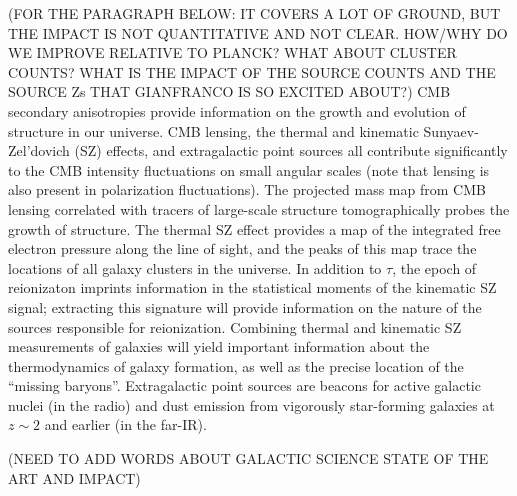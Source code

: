 \documentclass[PICOReport.tex]{subfiles}
\begin{document}
(FOR THE PARAGRAPH BELOW: IT COVERS A LOT OF GROUND, BUT THE IMPACT IS NOT QUANTITATIVE
AND NOT CLEAR. HOW/WHY DO WE IMPROVE RELATIVE TO PLANCK? WHAT ABOUT 
CLUSTER COUNTS? WHAT IS THE IMPACT OF THE SOURCE COUNTS AND THE SOURCE Zs THAT 
GIANFRANCO IS SO EXCITED ABOUT?)
CMB secondary anisotropies provide information on the growth and evolution of structure in our universe. 
CMB lensing, the thermal and kinematic Sunyaev-Zel'dovich (SZ) effects, and extragalactic point sources all 
contribute significantly to the CMB intensity fluctuations on small angular scales (note that lensing is also 
present in polarization fluctuations). The projected mass map from CMB lensing correlated with tracers of 
large-scale structure tomographically probes the growth of structure. The thermal SZ effect provides a map of 
the integrated free electron pressure along the line of sight, and the peaks of this map trace the locations of 
all galaxy clusters in the universe. In addition to $\tau$, the epoch of reionizaton imprints information in the 
statistical moments of the kinematic SZ signal; extracting this signature will provide information on the nature 
of the sources responsible for reionization.  Combining thermal and kinematic SZ measurements of galaxies 
will yield important information about the thermodynamics of galaxy formation, as well as the precise location 
of the ``missing baryons''. Extragalactic point sources are beacons for active galactic nuclei (in the radio) and 
dust emission from vigorously star-forming galaxies at $z \sim 2$ and earlier (in the far-IR).

(NEED TO ADD WORDS ABOUT GALACTIC SCIENCE STATE OF THE ART AND IMPACT)
\end{document}
